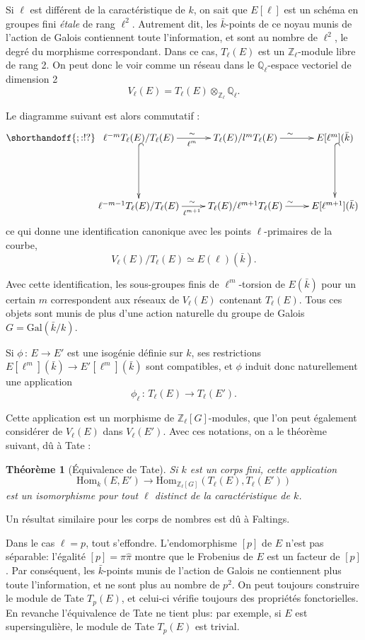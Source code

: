 \documentclass[11pt,a4paper]{article}
\newcommand{\Z}{\mathbb{Z}}
\newcommand{\Q}{\mathbb{Q}}
\newcommand{\vers}{\longrightarrow}
\newcommand{\Hom}{\mathrm{Hom}}
\newcommand{\de}{\,:\,}
\renewcommand{\v}{\vspace{5mm}}
\newtheorem*{thm}{Théorème}
\theoremstyle{definition}
\begin{document}
Si $\ell$ est différent de la caractéristique de $k$, on sait que $E[\ell]$ est un schéma en groupes fini \emph{étale} de rang $\ell^2$. Autrement dit, les $\bar{k}$-points de ce noyau munis de l'action de Galois contiennent toute l'information, et sont au nombre de $\ell^2$, le degré du morphisme correspondant. Dans ce cas, $T_\ell(E)$ est un $\Z_\ell$-module libre de rang 2. On peut donc le voir comme un réseau dans le $\Q_\ell$-espace vectoriel de dimension 2
$$V_\ell(E) = T_\ell(E) \otimes_{\Z_\ell} \Q_\ell.$$

Le diagramme suivant est alors commutatif :
$$
\shorthandoff{;:!?}
\xymatrix {
\ell^{-m} T_\ell(E)/ T_\ell(E) \ar[r]_{\ell^m}^{\sim} \ar@{^{(}->}[dd]&
 T_\ell(E)/ l^m T_\ell(E) \ar[r]^{\sim}  & 
 E[\ell^m](\bar{k}) \ar@{^{(}->}[dd] \\ 
 \\
 \ell^{-m-1} T_\ell(E)/ T_\ell(E) \ar[r]_{\ell^{m+1}}^{\sim} &
 T_\ell(E)/ \ell^{m+1} T_\ell(E) \ar[r]^{\sim}  & 
 E[\ell^{m+1}](\bar{k})
}
$$
ce qui donne une identification canonique avec les points $\ell$-primaires de la courbe,
$$ V_\ell(E)/ T_\ell(E) \simeq E(\ell)(\bar{k}).$$

Avec cette identification, les sous-groupes finis de $\ell^m$-torsion de $E(\bar{k})$ pour un certain $m$ correspondent aux réseaux de $V_\ell(E)$ contenant $T_\ell(E)$. Tous ces objets sont munis de plus d'une action naturelle du groupe de Galois $G= \mathrm{Gal}(\bar{k}/k)$.

Si $\phi\de E\vers E'$ est une isogénie définie sur $k$, ses restrictions $E[\ell^m](\bar{k})\vers E'[\ell^m](\bar{k})$ sont compatibles, et $\phi$ induit donc naturellement une application
$$ \phi_\ell\de T_\ell(E)\vers T_\ell(E').$$

Cette application est un morphisme de $\Z_\ell[G]$-modules, que l'on peut également considérer de $V_\ell(E)$ dans $V_\ell(E')$. Avec ces notations, on a le théorème suivant, dû à Tate :

\begin{thm}[Équivalence de Tate] Si $k$ est un corps fini, cette application
$$\Hom_k(E, E') \vers \Hom_{\Z_\ell[G]} (T_\ell(E), T_\ell(E'))$$
est un isomorphisme pour tout $\ell$ distinct de la caractéristique de $k$.
\end{thm}

Un résultat similaire pour les corps de nombres est dû à Faltings.
\v

Dans le cas $\ell=p$, tout s'effondre. L'endomorphisme $[p]$ de $E$ n'est pas séparable: l'égalité
$[p] = \pi \hat{\pi}$
montre que le Frobenius de $E$ est un facteur de $[p]$. Par conséquent, les $\bar{k}$-points munis de l'action de Galois ne contiennent plus toute l'information, et ne sont plus au nombre de $p^2$. On peut toujours construire le module de Tate $T_p(E)$, et celui-ci vérifie toujours des propriétés fonctorielles. En revanche l'équivalence de Tate ne tient plus: par exemple, si $E$ est supersingulière, le module de Tate $T_p(E)$ est trivial.
\end{document}
